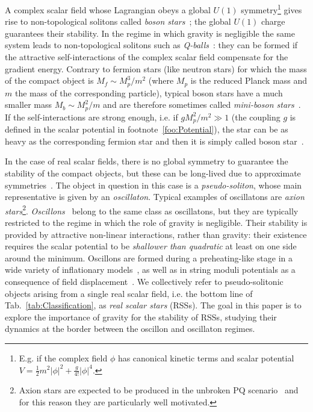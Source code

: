 \documentclass[11pt,a4paper]{article}
\begin{document}
A complex scalar field whose Lagrangian obeys a global $U(1)$ symmetry\footnote{E.g. if the complex field $\phi$ has canonical kinetic terms and scalar potential $V = \frac{1}{2} m^2 |\phi|^2 + \frac{g}{4!} |\phi|^4$.} \label{foo:Potential} gives rise to non-topological solitons called \textit{boson stars}~\cite{Jetzer:1991jr}; the global $U(1)$ charge guarantees their stability. In the regime in which gravity is negligible the same system leads to non-topological solitons such as \textit{Q-balls}~\cite{Coleman:1985ki}: they can be formed if the attractive self-interactions of the complex scalar field compensate for the gradient energy. Contrary to fermion stars (like neutron stars) for which the mass of the compact object is $M_f\sim M_p^3/m^2$ (where $M_p$ is the reduced Planck mass and $m$ the mass of the corresponding particle), typical boson stars have a much smaller mass $M_b\sim M_p^2/m$ and are therefore sometimes called {\it mini-boson stars}~\cite{Jetzer:1991jr}. If the self-interactions are strong enough, i.e. if $g M_p^2/m^2 \gg 1$ (the coupling $g$ is defined in the scalar potential in footnote~\ref{foo:Potential}), the star can be as heavy as the corresponding fermion star and then it is simply called boson star~\cite{Colpi:1986ye}.

In the case of real scalar fields, there is no global symmetry to guarantee the stability of the compact objects, but these can be long-lived due to approximate symmetries~\cite{Mukaida:2016hwd}. The object in question in this case is a \textit{pseudo-soliton}, whose main representative is given by an \textit{oscillaton}. Typical examples of oscillatons are \textit{axion stars}\footnote{Axion stars are expected to be produced in the unbroken PQ scenario~\cite{Kolb:1993zz, Kolb:1993hw, Hogan:1988mp, Visinelli:2017ooc} and for this reason they are particularly well motivated.}. \textit{Oscillons}~\cite{Seidel:1991zh, Kolb:1993hw, Alcubierre:2003sx, UrenaLopez:2001tw, UrenaLopez:2002gx, UrenaLopez:2012zz} belong to the same class as oscillatons, but they are typically restricted to the regime in which the role of gravity is negligible. Their stability is provided by attractive non-linear interactions, rather than gravity: their existence requires the scalar potential to be \textit{shallower than quadratic} at least on one side around the minimum. Oscillons are formed during a preheating-like stage in a wide variety of inflationary models~\cite{Amin:2011hj, Amin:2014eta, Amin:2013ika, Amin:2010jq, Antusch:2016con, Antusch:2017flz}, as well as in string moduli potentials as a consequence of field displacement~\cite{Antusch:2017flz}. We collectively refer to pseudo-solitonic objects arising from a single real scalar field, i.e. the bottom line of Tab.\ \ref{tab:Classification}, as \textit{real scalar stars} (RSSs). The goal in this paper is to explore the importance of gravity for the stability of RSSs, studying their dynamics at the border between the oscillon and oscillaton regimes.
\end{document}
